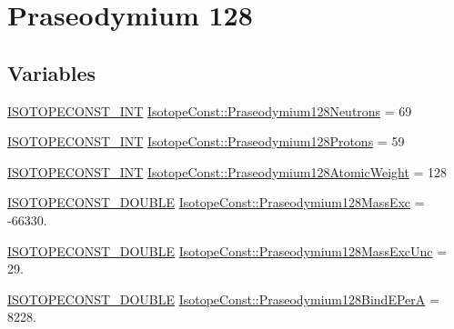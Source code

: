 \hypertarget{group___isotope_const-_praseodymium-_pr128}{}\section{Praseodymium 128}
\label{group___isotope_const-_praseodymium-_pr128}
\subsection*{Variables}
\begin{DoxyCompactItemize}
\item 
\mbox{\hyperlink{group___isotope_const-_macros_ga5f18360b3e99483a35c32d789e62621c}{I\+S\+O\+T\+O\+P\+E\+C\+O\+N\+S\+T\+\_\+\+I\+NT}} \mbox{\hyperlink{group___isotope_const-_praseodymium-_pr128_gafa976aadf3f6022f210246a8a89b4ee7}{Isotope\+Const\+::\+Praseodymium128\+Neutrons}} = 69
\item 
\mbox{\hyperlink{group___isotope_const-_macros_ga5f18360b3e99483a35c32d789e62621c}{I\+S\+O\+T\+O\+P\+E\+C\+O\+N\+S\+T\+\_\+\+I\+NT}} \mbox{\hyperlink{group___isotope_const-_praseodymium-_pr128_ga239dceb6868cce772c8a558772713e80}{Isotope\+Const\+::\+Praseodymium128\+Protons}} = 59
\item 
\mbox{\hyperlink{group___isotope_const-_macros_ga5f18360b3e99483a35c32d789e62621c}{I\+S\+O\+T\+O\+P\+E\+C\+O\+N\+S\+T\+\_\+\+I\+NT}} \mbox{\hyperlink{group___isotope_const-_praseodymium-_pr128_ga7e21f214ab2f074c2078592f150a8e0f}{Isotope\+Const\+::\+Praseodymium128\+Atomic\+Weight}} = 128
\item 
\mbox{\hyperlink{group___isotope_const-_macros_ga8f45a7272ce02c0b4c65c44636ed719a}{I\+S\+O\+T\+O\+P\+E\+C\+O\+N\+S\+T\+\_\+\+D\+O\+U\+B\+LE}} \mbox{\hyperlink{group___isotope_const-_praseodymium-_pr128_ga564ef69c864efb8739d88ddb2e961909}{Isotope\+Const\+::\+Praseodymium128\+Mass\+Exc}} = -\/66330.
\item 
\mbox{\hyperlink{group___isotope_const-_macros_ga8f45a7272ce02c0b4c65c44636ed719a}{I\+S\+O\+T\+O\+P\+E\+C\+O\+N\+S\+T\+\_\+\+D\+O\+U\+B\+LE}} \mbox{\hyperlink{group___isotope_const-_praseodymium-_pr128_gad82f1b24733b4bbc0d20548b72f6630c}{Isotope\+Const\+::\+Praseodymium128\+Mass\+Exc\+Unc}} = 29.
\item 
\mbox{\hyperlink{group___isotope_const-_macros_ga8f45a7272ce02c0b4c65c44636ed719a}{I\+S\+O\+T\+O\+P\+E\+C\+O\+N\+S\+T\+\_\+\+D\+O\+U\+B\+LE}} \mbox{\hyperlink{group___isotope_const-_praseodymium-_pr128_gab166934d0f7ad83a76808f8c7c1398b1}{Isotope\+Const\+::\+Praseodymium128\+Bind\+E\+PerA}} = 8228.

\end{DoxyCompactItemize}
